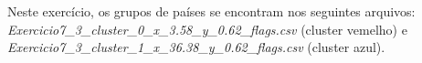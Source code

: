 \begin{figure}[ht!]
	\vspace{0mm}	%
	\begin{center}
	\end{center}
	\vspace{-2mm}	%
	\label{ex6_fig1}
\end{figure}

Neste exercício, os grupos de países se encontram nos seguintes arquivos: \textit{Exercicio7\_3\_cluster\_0\_x\_3.58\_y\_0.62\_flags.csv} (cluster vemelho) e \textit{Exercicio7\_3\_cluster\_1\_x\_36.38\_y\_0.62\_flags.csv} (cluster azul).